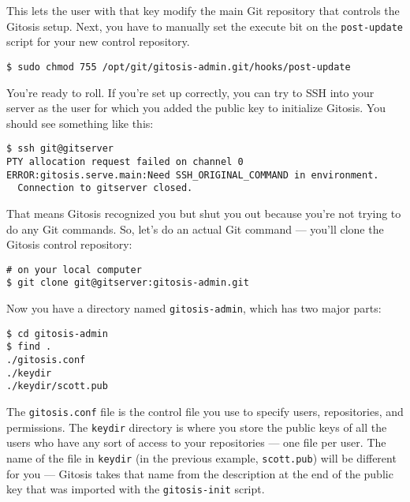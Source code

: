 \documentclass[a4paper]{book}
\begin{document}
This lets the user with that key modify the main Git repository that controls the Gitosis setup. Next, you have to manually set the execute bit on the \texttt{post-update} script for your new control repository.

\begin{shaded}\begin{verbatim}
$ sudo chmod 755 /opt/git/gitosis-admin.git/hooks/post-update
\end{verbatim}\end{shaded}

You're ready to roll. If you're set up correctly, you can try to SSH into your server as the user for which you added the public key to initialize Gitosis. You should see something like this:

\begin{shaded}\begin{verbatim}
$ ssh git@gitserver
PTY allocation request failed on channel 0
ERROR:gitosis.serve.main:Need SSH_ORIGINAL_COMMAND in environment.
  Connection to gitserver closed.
\end{verbatim}\end{shaded}

That means Gitosis recognized you but shut you out because you're not trying to do any Git commands. So, let's do an actual Git command --- you'll clone the Gitosis control repository:

\begin{shaded}\begin{verbatim}
# on your local computer
$ git clone git@gitserver:gitosis-admin.git
\end{verbatim}\end{shaded}

Now you have a directory named \texttt{gitosis-admin}, which has two major parts:

\begin{shaded}\begin{verbatim}
$ cd gitosis-admin
$ find .
./gitosis.conf
./keydir
./keydir/scott.pub
\end{verbatim}\end{shaded}

The \texttt{gitosis.conf} file is the control file you use to specify users, repositories, and permissions. The \texttt{keydir} directory is where you store the public keys of all the users who have any sort of access to your repositories --- one file per user. The name of the file in \texttt{keydir} (in the previous example, \texttt{scott.pub}) will be different for you --- Gitosis takes that name from the description at the end of the public key that was imported with the \texttt{gitosis-init} script.
\end{document}

